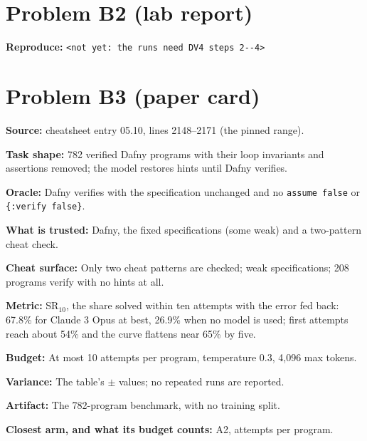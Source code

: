 \documentclass[11pt]{article}
\begin{document}
\section*{Problem B2 (lab report)}\label{ans:B2}
\begin{answer}
\textbf{Reproduce:} \verb+<not yet: the runs need DV4 steps 2--4>+
\end{answer}

\section*{Problem B3 (paper card)}\label{ans:B3}
\begin{answer}
\textbf{Source:} cheatsheet entry 05.10, lines 2148--2171 (the pinned range).

\textbf{Task shape:} 782 verified Dafny programs with their loop invariants and
assertions removed; the model restores hints until Dafny verifies.

\textbf{Oracle:} Dafny verifies with the specification unchanged and no \texttt{assume
false} or \texttt{\{:verify false\}}.

\textbf{What is trusted:} Dafny, the fixed specifications (some weak) and a
two-pattern cheat check.

\textbf{Cheat surface:} Only two cheat patterns are checked; weak specifications; 208
programs verify with no hints at all.

\textbf{Metric:} SR$_{10}$, the share solved within ten attempts with the error fed
back: 67.8\% for Claude 3 Opus at best, 26.9\% when no model is used; first attempts
reach about 54\% and the curve flattens near 65\% by five.

\textbf{Budget:} At most 10 attempts per program, temperature 0.3, 4,096 max tokens.

\textbf{Variance:} The table's $\pm$ values; no repeated runs are reported.

\textbf{Artifact:} The 782-program benchmark, with no training split.

\textbf{Closest arm, and what its budget counts:} A2, attempts per program.
\end{answer}

\end{document}
